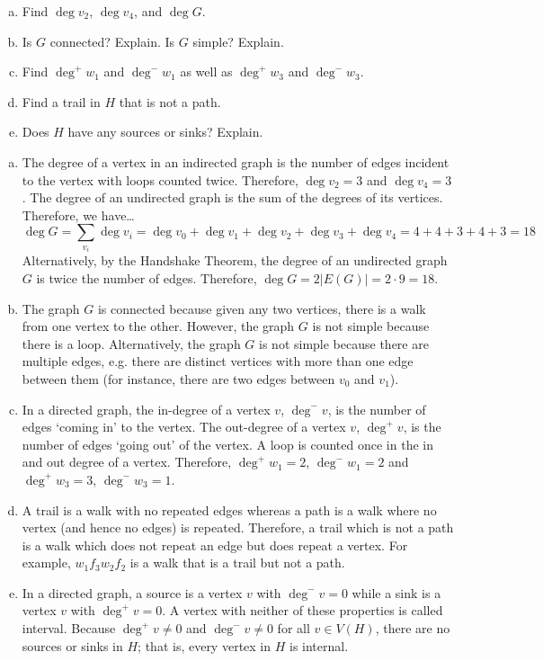 \documentclass[11pt,letterpaper]{article}
\begin{document}
\begin{enumerate}[(a)]
\item Find $\deg v_2$, $\deg v_4$, and $\deg G$.
\item Is $G$ connected? Explain. Is $G$ simple? Explain.
\item Find $\deg^+ \!w_1$ and $\deg^- \!w_1$ as well as $\deg^+ \!w_3$ and $\deg^- \!w_3$. 
\item Find a trail in $H$ that is not a path. 
\item Does $H$ have any sources or sinks? Explain. 
\end{enumerate} \pspace

\sol 
\begin{enumerate}[(a)]
\item The degree of a vertex in an indirected graph is the number of edges incident to the vertex with loops counted twice. Therefore, $\deg v_2= 3$ and $\deg v_4= 3$. The degree of an undirected graph is the sum of the degrees of its vertices. Therefore, we have\dots
	\[
	\deg G= \sum_{v_i} \deg v_i= \deg v_0 + \deg v_1 + \deg v_2 + \deg v_3 + \deg v_4= 4 + 4 + 3 + 4 + 3= 18
	\]
Alternatively, by the Handshake Theorem, the degree of an undirected graph $G$ is twice the number of edges. Therefore, $\deg G= 2 |E(G)|= 2 \cdot 9= 18$. \pspace

\item The graph $G$ is connected because given any two vertices, there is a walk from one vertex to the other. However, the graph $G$ is not simple because there is a loop. Alternatively, the graph $G$ is not simple because there are multiple edges, e.g. there are distinct vertices with more than one edge between them (for instance, there are two edges between $v_0$ and $v_1$). \pspace

\item In a directed graph, the in-degree of a vertex $v$, $\deg^- v$, is the number of edges `coming in' to the vertex. The out-degree of a vertex $v$, $\deg^+ v$, is the number of edges `going out' of the vertex. A loop is counted once in the in and out degree of a vertex. Therefore, $\deg^+ w_1= 2$, $\deg^- w_1= 2$ and $\deg^+ \!w_3= 3$, $\deg^- \!w_3= 1$. \pspace

\item A trail is a walk with no repeated edges whereas a path is a walk where no vertex (and hence no edges) is repeated. Therefore, a trail which is not a path is a walk which does not repeat an edge but does repeat a vertex. For example, $w_1f_3w_2f_2$ is a walk that is a trail but not a path. \pspace

\item In a directed graph, a source is a vertex $v$ with $\deg^- \!v= 0$ while a sink is a vertex $v$ with $\deg^+ \!v= 0$. A vertex with neither of these properties is called interval. Because $\deg^+ \!v \neq 0$ and $\deg^- \!v \neq 0$ for all $v \in V(H)$, there are no sources or sinks in $H$; that is, every vertex in $H$ is internal. 
\end{enumerate}
\end{document}
